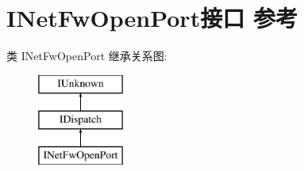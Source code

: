 \hypertarget{interface_i_net_fw_open_port}{}\section{I\+Net\+Fw\+Open\+Port接口 参考}
\label{interface_i_net_fw_open_port}
类 I\+Net\+Fw\+Open\+Port 继承关系图\+:\begin{figure}[H]
\begin{center}
\leavevmode
\includegraphics[height=3.000000cm]{interface_i_net_fw_open_port}
\end{center}
\end{figure}
